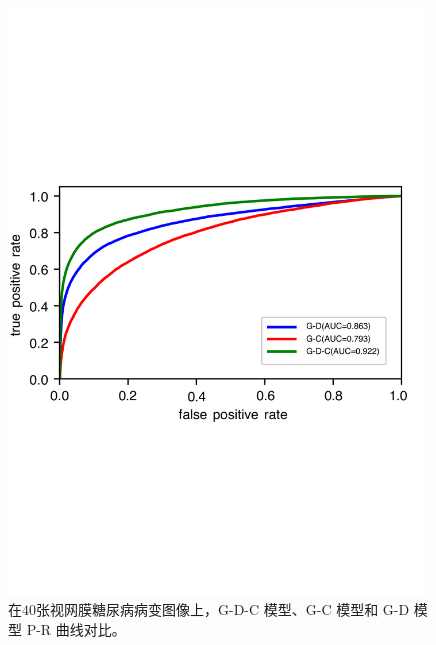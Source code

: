 \begin{figure}[H]
	\centering
	\includegraphics[width=0.98\textwidth]{figure/ROC_u_d_u_c_u_d_c_components}
	\caption[G-D-C 模型、G-C 模型和 G-D 模型 P-R 曲线对比]{在$40$张视网膜糖尿病病变图像上，G-D-C 模型、G-C 模型和 G-D 模型 P-R 曲线对比。}
	\label{fig:roc_u_d_u_c_u_d_c_components}
\end{figure}
\endinput
